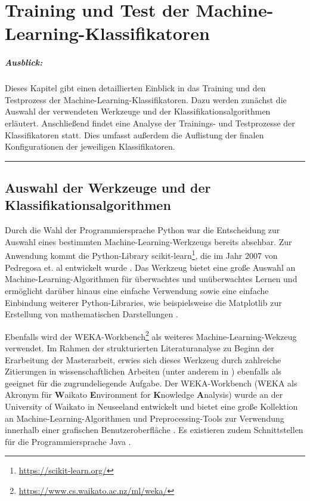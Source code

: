 
\chapter{Training und Test der Machine-Learning-Klassifikatoren}
\label{training}

\paragraph{Ausblick:}
Dieses Kapitel gibt einen detaillierten Einblick in das Training und den Testprozess der Machine-Learning-Klassifikatoren. Dazu werden zunächst die Auswahl der verwendeten Werkzeuge und der Klassifikationsalgorithmen erläutert. Anschließend findet eine Analyse der Trainings- und Testprozesse der Klassifikatoren statt. Dies umfasst außerdem die Auflistung der finalen Konfigurationen der jeweiligen Klassifikatoren.
\\
\hrule

\section{Auswahl der Werkzeuge und der Klassifikationsalgorithmen}

Durch die Wahl der Programmiersprache Python war die Entscheidung zur Auswahl eines bestimmten Machine-Learning-Werkzeugs bereits absehbar. Zur Anwendung kommt die Python-Library scikit-learn\footnote{\href{https://scikit-learn.org/}{https://scikit-learn.org/}}, die im Jahr 2007 von Pedregosa et. al entwickelt wurde \cite{scikit}. Das Werkzeug bietet eine große Auswahl an Machine-Learning-Algorithmen für überwachtes und unüberwachtes Lernen und ermöglicht darüber hinaus eine einfache Verwendung sowie eine einfache Einbindung weiterer Python-Libraries, wie beispielsweise die Matplotlib zur Erstellung von mathematischen Darstellungen \cite{scikit}.

Ebenfalls wird der WEKA-Workbench\footnote{\href{https://www.cs.waikato.ac.nz/ml/weka/}{https://www.cs.waikato.ac.nz/ml/weka/}} als weiteres Machine-Learning-Wekzeug verwendet. Im Rahmen der strukturierten Literaturanalyse zu Beginn der Erarbeitung der Masterarbeit, erwies sich dieses Werkzeug durch zahlreiche Zitierungen in wissenschaftlichen Arbeiten (unter anderem in \cite{Hammouri2018,Queiroz2016,Ratzinger2008}) ebenfalls als geeignet für die zugrundeliegende Aufgabe. Der WEKA-Workbench (WEKA als Akronym für \textbf{W}aikato \textbf{E}nvironment for \textbf{K}nowledge \textbf{A}nalysis) wurde an der University of Waikato in Neuseeland entwickelt und bietet eine große Kollektion an Machine-Learning-Algorithmen und Preprocessing-Tools zur Verwendung innerhalb einer grafischen Benutzeroberfläche \cite{Weka2016}. Es existieren zudem Schnittstellen für die Programmiersprache Java \cite{Weka2016}. 

